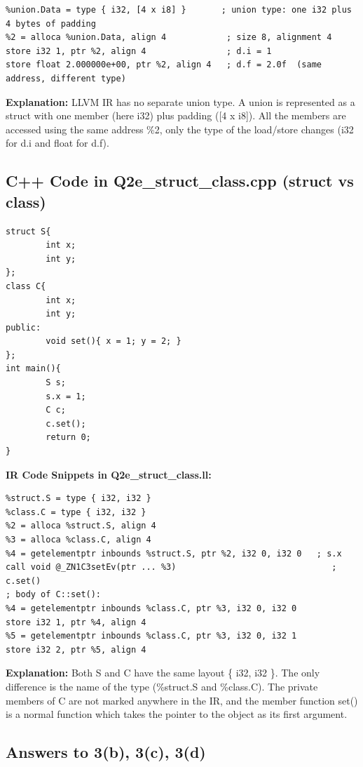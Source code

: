 \begin{lstlisting}
%union.Data = type { i32, [4 x i8] }       ; union type: one i32 plus 4 bytes of padding
%2 = alloca %union.Data, align 4            ; size 8, alignment 4
store i32 1, ptr %2, align 4                ; d.i = 1
store float 2.000000e+00, ptr %2, align 4   ; d.f = 2.0f  (same address, different type)
\end{lstlisting}

\textbf{Explanation: }LLVM IR has no separate union type. A union is represented as a struct with one member (here i32) plus padding ([4 x i8]). All the members are accessed using the same address \%2, only the type of the load/store changes (i32 for d.i and float for d.f).


\subsection{C++ Code in Q2e\_struct\_class.cpp (struct vs class)}

\begin{lstlisting}
struct S{
        int x;
        int y;
};
class C{
        int x;
        int y;
public:
        void set(){ x = 1; y = 2; }
};
int main(){
        S s;
        s.x = 1;
        C c;
        c.set();
        return 0;
}
\end{lstlisting}

\medskip\noindent\textbf{IR Code Snippets in Q2e\_struct\_class.ll:}\par

\begin{lstlisting}
%struct.S = type { i32, i32 }
%class.C = type { i32, i32 }
%2 = alloca %struct.S, align 4
%3 = alloca %class.C, align 4
%4 = getelementptr inbounds %struct.S, ptr %2, i32 0, i32 0   ; s.x
call void @_ZN1C3setEv(ptr ... %3)                               ; c.set()
; body of C::set():
%4 = getelementptr inbounds %class.C, ptr %3, i32 0, i32 0
store i32 1, ptr %4, align 4
%5 = getelementptr inbounds %class.C, ptr %3, i32 0, i32 1
store i32 2, ptr %5, align 4
\end{lstlisting}

\textbf{Explanation: }Both S and C have the same layout \{ i32, i32 \}. The only difference is the name of the type (\%struct.S and \%class.C). The private members of C are not marked anywhere in the IR, and the member function set() is a normal function which takes the pointer to the object as its first argument.


\subsection*{Answers to 3(b), 3(c), 3(d)}

